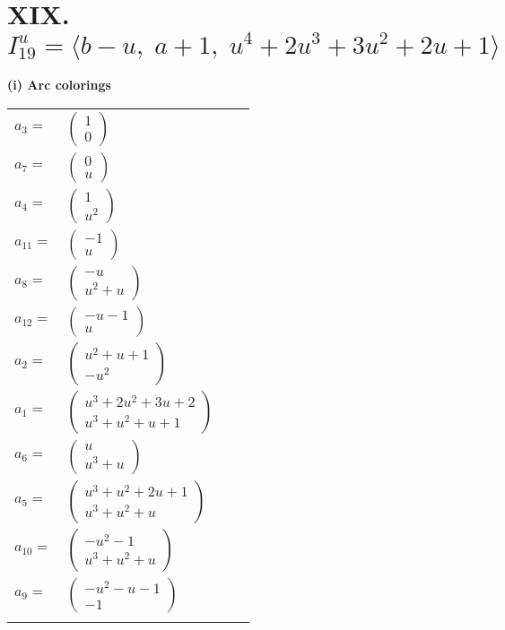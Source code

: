 \documentclass[1p]{elsarticle_modified}
\theoremstyle{definition}
\begin{document}
\centering \section*{XIX. $I^u_{19}= \langle b- u,\;a+1,\;u^4+2 u^3+3 u^2+2 u+1 \rangle$}
\flushleft \textbf{(i) Arc colorings}\\
\begin{tabular}{m{7pt} m{180pt} m{7pt} m{180pt} }
\flushright $a_{3}=$&$\begin{pmatrix}1\\0\end{pmatrix}$ \\
\flushright $a_{7}=$&$\begin{pmatrix}0\\u\end{pmatrix}$ \\
\flushright $a_{4}=$&$\begin{pmatrix}1\\u^2\end{pmatrix}$ \\
\flushright $a_{11}=$&$\begin{pmatrix}-1\\u\end{pmatrix}$ \\
\flushright $a_{8}=$&$\begin{pmatrix}- u\\u^2+u\end{pmatrix}$ \\
\flushright $a_{12}=$&$\begin{pmatrix}- u-1\\u\end{pmatrix}$ \\
\flushright $a_{2}=$&$\begin{pmatrix}u^2+u+1\\- u^2\end{pmatrix}$ \\
\flushright $a_{1}=$&$\begin{pmatrix}u^3+2 u^2+3 u+2\\u^3+u^2+u+1\end{pmatrix}$ \\
\flushright $a_{6}=$&$\begin{pmatrix}u\\u^3+u\end{pmatrix}$ \\
\flushright $a_{5}=$&$\begin{pmatrix}u^3+u^2+2 u+1\\u^3+u^2+u\end{pmatrix}$ \\
\flushright $a_{10}=$&$\begin{pmatrix}- u^2-1\\u^3+u^2+u\end{pmatrix}$ \\
\flushright $a_{9}=$&$\begin{pmatrix}- u^2- u-1\\-1\end{pmatrix}$\\&\end{tabular}
\end{document}
